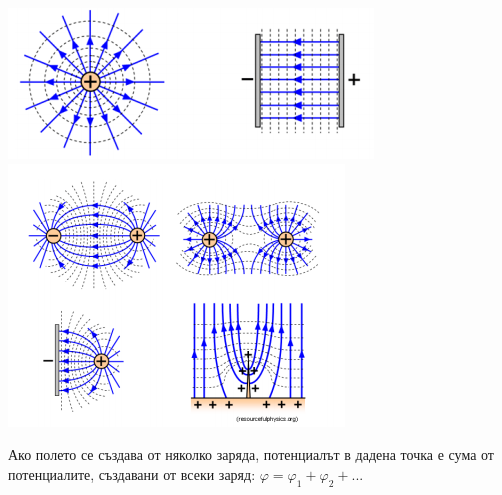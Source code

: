 \documentclass[fleqn, 12pt]{article}
\theoremstyle{definition}
\begin{document}
\begin{center}
  \includegraphics{Pics/physics/lec6-7-1.png}
  \includegraphics{Pics/physics/lec6-7-2.png}
\end{center}
Ако полето се създава от няколко заряда, потенциалът в дадена точка е сума от
потенциалите, създавани от всеки заряд: $\varphi = \varphi_1 + \varphi_2 + ... $
\end{document}
